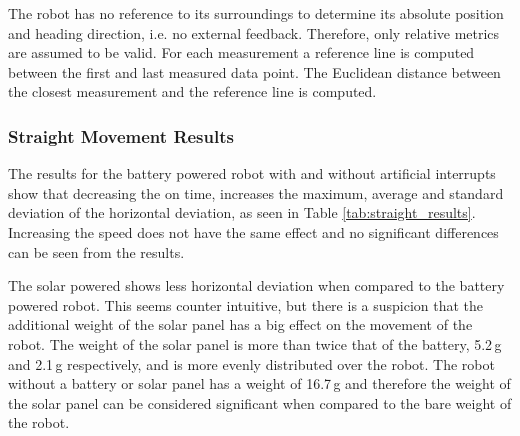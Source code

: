 The robot has no reference to its surroundings to determine its absolute position and heading direction, i.e. no external feedback.
Therefore, only relative metrics are assumed to be valid.
For each measurement a reference line is computed between the first and last measured data point.
The Euclidean distance between the closest measurement and the reference line is computed.

\subsubsection{Straight Movement Results}

The results for the battery powered robot with and without artificial interrupts show that decreasing the on time, increases the maximum, average and standard deviation of the horizontal deviation, as seen in Table \ref{tab:straight_results}.
Increasing the speed does not have the same effect and no significant differences can be seen from the results.

The solar powered shows less horizontal deviation when compared to the battery powered robot.
This seems counter intuitive, but there is a suspicion that the additional weight of the solar panel has a big effect on the movement of the robot.
The weight of the solar panel is more than twice that of the battery, 5.2\,g and 2.1\,g respectively, and is more evenly distributed over the robot.
The robot without a battery or solar panel has a weight of 16.7\,g and therefore the weight of the solar panel can be considered significant when compared to the bare weight of the robot.

